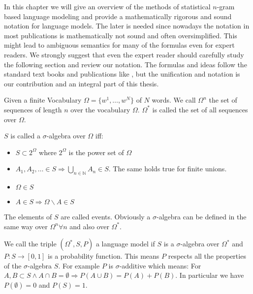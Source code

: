 \documentclass[•]{book}
\begin{document}
In this chapter we will give an overview of the methods of statistical $n$-gram based language modeling and provide a mathematically rigorous and sound notation for language models.
The later is needed since nowadays the notation in most publications is mathematically not sound and often oversimplified.
This might lead to ambiguous semantics for many of the formulas even for expert readers. 
We strongly suggest that even the expert reader should carefully study the following section and review our notation. 
The formulas and ideas follow the standard text books and publications like \cite{chen:goodman},  but the unification and notation is our contribution and an integral part of this thesis. 

Given a finite Vocabulary $\Omega = \{w^1,\dots,w^N\}$ of $N$ words. 
We call $\Omega^{n}$ the set of sequences of length $n$ over the vocabulary $\Omega$.
$\Omega^{*}$ is called the set of all sequences over $\Omega$.
\begin{definition}
$S$ is called a $\sigma$-algebra over $\Omega$ iff:

\begin{itemize}
\item $S\subset 2^{\Omega}$ where $2^{\Omega}$ is the power set of $\Omega$  \eqnum
\item $A_1,A_2,\dots \in S \Rightarrow \bigcup_{n\in\mathbb{N}}A_n \in S$. The same holds true for finite unions. 
\item $\Omega \in S$ \eqnum
\item $A\in S \Rightarrow \Omega\backslash A \in S$ \eqnum
\end{itemize}

\end{definition}
The elements of $S$ are called events.
Obviously a $\sigma$-algebra can be defined in the same way over $\Omega^{n} \forall n$ and also over $\Omega^{*}$. 

\begin{definition}We call the triple $(\Omega^{*}, S, P)$ a language model if $S$ is a $\sigma$-algebra over $\Omega^{*}$ and $P:S\longrightarrow [0,1]$ is a probability function.  
This means $P$ respects all the properties of the $\sigma$-algebra $S$. 
For example $P$ is $\sigma$-additive which means: 
For $A,B \subset S \land A\cap B = \emptyset \Rightarrow P(A\cup B) = P(A)+P(B)$. 
In particular we have $P(\emptyset)=0$ and $P(S)=1$. 
\end{definition} 
\end{document}
